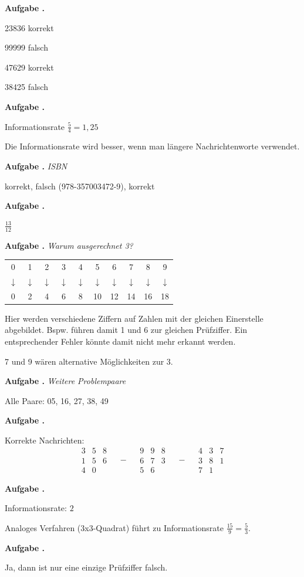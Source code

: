 \documentclass[a4paper,ngerman,12pt]{scrartcl}
\theoremstyle{definition}
\theoremstyle{plain}
\theoremstyle{remark}
\newlength{\aufgabenskip}
\newcounter{aufgabennummer}
\newenvironment{aufgabe}[1]{
	\addtocounter{aufgabennummer}{1}
	\textbf{Aufgabe \theaufgabennummer.} \emph{#1} \par
}{\vspace{\aufgabenskip}}
\begin{document}
\begin{aufgabe}{}
	23836 korrekt
	
	99999 falsch
	
	47629 korrekt
	
	38425 falsch
\end{aufgabe}

\begin{aufgabe}{}
	Informationsrate $\frac{5}{4} = 1,25$
	
	Die Informationsrate wird besser, wenn man längere Nachrichtenworte verwendet.
\end{aufgabe}

\begin{aufgabe}{ISBN}
	korrekt, falsch (978-357003472-9), korrekt
\end{aufgabe}

\begin{aufgabe}{}
	$\frac{13}{12}$
\end{aufgabe}

\begin{aufgabe}{Warum ausgerechnet 3?}
	\begin{center}
		\begin{tabular}{cccccccccc}
			0 & 1 & 2 & 3 & 4 & 5 & 6 & 7 & 8 & 9 \\
			$\downarrow$ & $\downarrow$ & $\downarrow$ & $\downarrow$ & $\downarrow$ & $\downarrow$ & $\downarrow$ & $\downarrow$ & $\downarrow$ & $\downarrow$ \\
			0 & 2 & 4 & 6 & 8 & 10 & 12 & 14 & 16 & 18
		\end{tabular}
	\end{center}
	
	Hier werden verschiedene Ziffern auf Zahlen mit der gleichen Einerstelle abgebildet. Bspw. führen damit 1 und 6 zur gleichen Prüfziffer. Ein entsprechender Fehler könnte damit nicht mehr erkannt werden.
	
	7 und 9 wären alternative Möglichkeiten zur 3.
\end{aufgabe}

\begin{aufgabe}{Weitere Problempaare}
	Alle Paare: 05, 16, 27, 38, 49
\end{aufgabe}

\begin{aufgabe}{}
	Korrekte Nachrichten:
	\[\begin{array}{ccc}3 & 5 & 8\\1 & 5 & 6 \\ 4 & 0 &\end{array} \quad-\quad \begin{array}{ccc}9 & 9 & 8\\6 & 7 & 3 \\ 5 & 6 &\end{array} \quad-\quad \begin{array}{ccc}4 & 3 & 7\\3 & 8 & 1 \\ 7 & 1 &\end{array}\]
\end{aufgabe}

\begin{aufgabe}{}
	Informationsrate: $2$
	
	Analoges Verfahren (3x3-Quadrat) führt zu Informationsrate $\frac{15}{9}=\frac{5}{3}$.
\end{aufgabe}

\begin{aufgabe}{}
	Ja, dann ist nur eine einzige Prüfziffer falsch.
\end{aufgabe}
\end{document}
